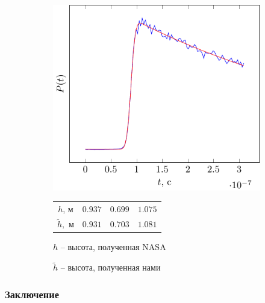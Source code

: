 \documentclass[10pt,pdf,hyperref={unicode}, dvipsnames]{beamer}
\begin{document}
\begin{frame}
\begin{figure}[ht]
\begin{subfigure}{0.42\linewidth}
    \end{subfigure}
    \hfill
    \begin{subfigure}{0.42\linewidth}
        \centering
        \includegraphics[width=\linewidth, page=3]{fig/retracking/real}
    \end{subfigure}
    \hfill
    \begin{subfigure}{0.42\linewidth}
        \centering
        \begin{tabular}{|c|c|c|c|}
            \hline
            $h$, м      & $0.937 $ & $0.699$ & $1.075$ \\
            $\tilde h,$ м & $0.931$ & $0.703$ & $1.081$ \\
            \hline
        \end{tabular}

        \vspace{\baselineskip}

        $h$ -- высота, полученная NASA

        $\tilde h$ -- высота, полученная нами
    \end{subfigure}
    \label{fig:impulse_jason}
\end{figure}
\end{frame}

\begin{frame}

\frametitle{Заключение}
\vskip -3pt
\begin{figure}
\end{figure}
\end{frame}
\end{document}
